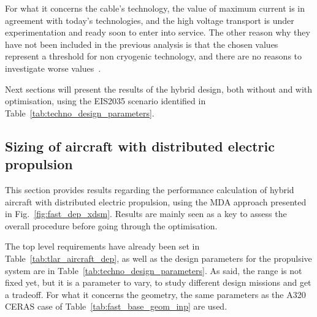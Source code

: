 For what it concerns the cable's technology, the value of maximum current is in agreement with today's technologies, and the high voltage transport is under experimentation and ready soon to enter into service.
The other reason why they have not been included in the previous analysis is that the chosen values represent a threshold for non cryogenic technology, and there are no reasons to investigate worse values~\cite{bib:xin}. 

Next sections will present the results of the hybrid design, both without and with optimisation, using the EIS2035 scenario identified in Table~\ref{tab:techno_design_parameters}. 

\subsection{Sizing of aircraft with distributed electric propulsion}
\label{subsec:chap3_hybrid_expl_no_optim}

This section provides results regarding the performance calculation of hybrid aircraft with distributed electric propulsion, using the MDA approach presented in Fig.~\ref{fig:fast_dep_xdsm}. 
Results are mainly seen as a key to assess the overall procedure before going through the optimisation. 

The top level requirements have already been set in Table~\ref{tab:tlar_aircraft_dep}, as well as the design parameters for the propulsive system are in Table~\ref{tab:techno_design_parameters}. 
As said, the range is not fixed yet, but it is a parameter to vary, to study different design missions and get a tradeoff. 
For what it concerns the geometry, the same parameters as the A320 CERAS case of Table~\ref{tab:fast_base_geom_inp} are used. 

